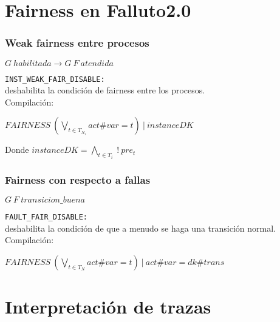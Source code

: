 \documentclass[serif]{beamer}
\begin{document}
\section{Fairness en Falluto2.0}

\begin{frame}
\frametitle{Weak fairness entre procesos}

\begin{framed}
$G~habilitada \rightarrow G~F~atendida$
\end{framed}

\texttt{INST\_WEAK\_FAIR\_DISABLE:}\\[0.3cm]
deshabilita la condición de fairness entre los procesos.\\[0.3cm]
Compilación:
\begin{framed}
$FAIRNESS~(\bigvee_{t \in T_{N_i}} act\#var = t)~|~instanceDK$
\end{framed}
Donde $instanceDK = \bigwedge_{t \in T_i}~!~pre_t~$
\end{frame}


\begin{frame}
\frametitle{Fairness con respecto a fallas}
\begin{framed}
$G~F~transicion\_buena$
\end{framed}
\texttt{FAULT\_FAIR\_DISABLE:}\\[0.3cm]
deshabilita la condición de que a menudo se haga una transición normal.\\[0.3cm]
Compilación:
\begin{framed}
$FAIRNESS~(\bigvee_{t \in {T_N}} act\#var = t)~|~act\#var = dk\#trans$
\end{framed}

\end{frame}

\section{Interpretación de trazas}
\end{document}
